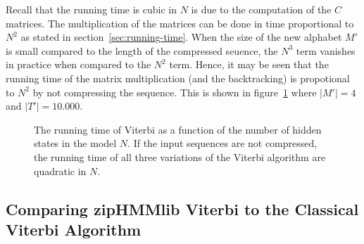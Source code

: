 Recall that the running time is cubic in $N$ is due to the computation of the
$C$ matrices. The multiplication of the matrices can be done in time
proportional to $N^2$ as stated in section~\ref{sec:running-time}. When the
size of the new alphabet $M'$ is small compared to the length of the compressed
seuence, the $N^3$ term vanishes in practice when compared to the $N^2$
term. Hence, it may be seen that the running time of the matrix multiplication
(and the backtracking) is propotional to $N^2$ by not compressing the
sequence. This is shown in figure~\ref{fig:assymptotic_viterbi_N} where
$\lvert M' \rvert = 4$ and $\lvert T' \rvert = 10.000$.

\begin{figure}
  \centering
  
  \caption{The running time of Viterbi as a function of the number of hidden
    states in the model $N$. If the input sequences are not compressed, the
    running time of all three variations of the Viterbi algorithm are quadratic
    in $N$.}
  \label{fig:assymptotic_viterbi_N}
\end{figure}


\subsection{Comparing zipHMMlib Viterbi to the Classical Viterbi Algorithm}
\label{sec:comp-ziphmml-viterbi}

